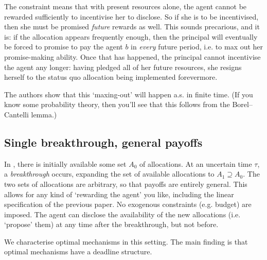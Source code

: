 The constraint means that with present resources alone,
the agent cannot be rewarded sufficiently to incentivise her to disclose.
So if she is to be incentivised, then she must be promised \emph{future} rewards as well.
This sounds precarious, and it is: if the allocation appears frequently enough, then the principal will eventually be forced to promise to pay the agent $b$ in \emph{every} future period, i.e. to max out her promise-making ability. Once that has happened, the principal cannot incentivise the agent any longer: having pledged all of her future resources, she resigns herself to the status quo allocation being implemented forevermore.

The authors show that this `maxing-out' will happen a.s. in finite time. (If you know some probability theory, then you'll see that this follows from the Borel--Cantelli lemma.)



\subsection{Single breakthrough, general payoffs}
\label{sec:ch4:dynamics:sfb}

In \textcite{sfb}, there is initially available some set $A_0$ of allocations.
At an uncertain time $\tau$, a \emph{breakthrough} occurs, expanding the set of available allocations to $A_1 \supseteq A_0$.
The two sets of allocations are arbitrary, so that payoffs are entirely general.
This allows for any kind of `rewarding the agent' you like, including the linear specification of the previous paper.
No exogenous constraints (e.g. budget) are imposed.
The agent can disclose the availability of the new allocations (i.e. `propose' them) at any time after the breakthrough, but not before.

We characterise optimal mechanisms in this setting. The main finding is that optimal mechanisms have a deadline structure.
